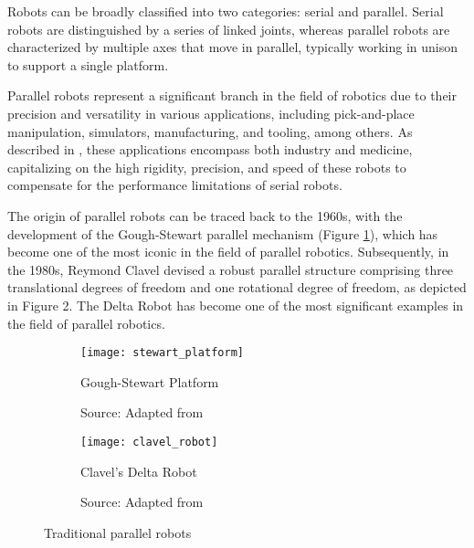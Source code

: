 \par Robots can be broadly classified into two categories: serial and parallel. Serial robots are distinguished by a series of linked joints, whereas parallel robots are characterized by multiple axes that move in parallel, typically working in unison to support a single platform.

\par Parallel robots represent a significant branch in the field of robotics due to their precision and versatility in various applications, including pick-and-place manipulation, simulators, manufacturing, and tooling, among others. As described in \cite{shao2024}, these applications encompass both industry and medicine, capitalizing on the high rigidity, precision, and speed of these robots to compensate for the performance limitations of serial robots.

\par The origin of parallel robots can be traced back to the 1960s, with the development of the Gough-Stewart \cite{stewart1965} parallel mechanism (Figure \ref{fig:stewart_platform}), which has become one of the most iconic in the field of parallel robotics. Subsequently, in the 1980s, Reymond Clavel devised a robust parallel structure comprising three translational degrees of freedom and one rotational degree of freedom, as depicted in Figure 2. The Delta Robot has become one of the most significant examples in the field of parallel robotics. 

\begin{figure}
    \centering
    \begin{subfigure}[t]{0.45\textwidth}
        \texttt{[image: stewart\_platform]}
        \caption{Gough-Stewart Platform}
        \caption*{Source: Adapted from \cite{stewart1965}}
        \label{fig:stewart_platform}
    \end{subfigure}
    \begin{subfigure}[t]{0.45\textwidth}
        \texttt{[image: clavel\_robot]}
        \caption{Clavel's Delta Robot}
        \caption*{Source: Adapted from \cite{sandyEFPL}}
        \label{fig:delta_robot}
    \end{subfigure}
    \caption{Traditional parallel robots}
    \label{fig:traditionals}
\end{figure}

